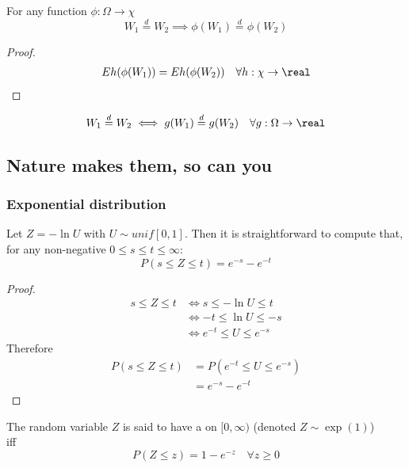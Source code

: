 \documentclass[11pt]{article}
\numberwithin{equation}{section}
\begin{document}
\proposition[invariance 1]
For any function $\phi: \Omega \rightarrow \chi$
\begin{equation}
	W_1 \overset{d}{=} W_2 \implies \phi(W_1) \overset{d}{=} \phi(W_2)
\end{equation}
\begin{proof}
\begin{align*}
	Eh(\phi(W_1)) = Eh(\phi(W_2)) \quad \forall h: \chi \rightarrow \real
\end{align*}
\end{proof}

\proposition[invariance 2]
\begin{equation}
	W_1 \overset{d}{=} W_2 \iff g(W_1) \overset{d}{=}  g(W_2) \quad \forall g: \Omega \rightarrow \real
\end{equation}

\subsection{Nature makes them, so can you}
\subsubsection{Exponential distribution}
Let $Z = -\ln U$ with $U \sim unif[0,1]$. Then it is straightforward to compute that, for any non-negative $0 \leq s \leq t \leq \infty$:
\begin{equation}
	P(s \leq Z \leq t) = e^{-s} - e^{-t}
\end{equation}
\begin{proof}
\begin{align*}
	s \leq Z \leq t &\iff s \leq -\ln U \leq t\\
	&\iff -t \leq \ln U \leq -s\\
	&\iff e^{-t} \leq U \leq e^{-s}
\end{align*}
Therefore 
\begin{align*}
	P(s \leq Z \leq t) &= P(e^{-t} \leq U \leq e^{-s}) \\
	&= e^{-s} - e^{-t}
\end{align*}	
\end{proof}
 The random variable $Z$ is said to have a  on $[0, \infty)$ (denoted $Z \sim \exp(1)$)\\
iff \\
\begin{equation}
	P(Z \leq z) = 1 - e^{-z} \quad \forall z \geq 0
\end{equation}
\end{document}

